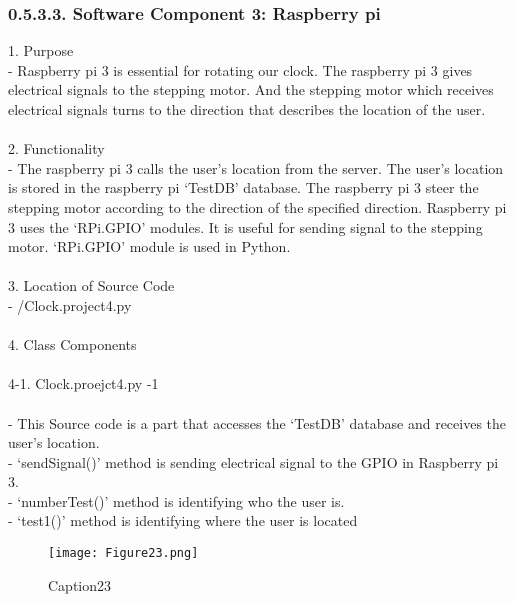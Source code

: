 \documentclass[10pt,a4paper,twocolumn]{report}
\begin{document}
\begin{enumerate}
	\subsubsection{0.5.3.3. Software Component 3: Raspberry pi}
			1. Purpose \\
			- Raspberry pi 3 is essential for rotating our clock. The raspberry pi 3 gives electrical signals to the stepping motor. And the stepping motor which receives electrical signals turns to the direction that describes the location of the user. \\\\
			2. Functionality \\
			- The raspberry pi 3 calls the user’s location from the server. The user’s location is stored in the raspberry pi ‘TestDB’ database. The raspberry pi 3 steer the stepping motor according to the direction of the specified direction. Raspberry pi 3 uses the ‘RPi.GPIO’ modules. It is useful for sending signal to the stepping motor. ‘RPi.GPIO’ module is used in Python. \\\\
			3. Location of Source Code \\
			- /Clock.project4.py \\\\
			4. Class Components \\\\
			4-1. Clock.proejct4.py -1 \\\\
			- This Source code is a part that accesses the ‘TestDB’ database and receives the user’s location. \\
- ‘sendSignal()’ method is sending electrical signal to the GPIO in Raspberry pi 3. \\
- ‘numberTest()’ method is identifying who the user is.\\
- ‘test1()’ method is identifying where the user is located \\
			\begin{figure}[h]
				\texttt{[image: Figure23.png]}
				\caption{Caption23}
				\label{fig23}
			\end{figure}
			\\\\\\\\\\\\\\\\\\\\\\\\\

\end{enumerate}
\end{document}
